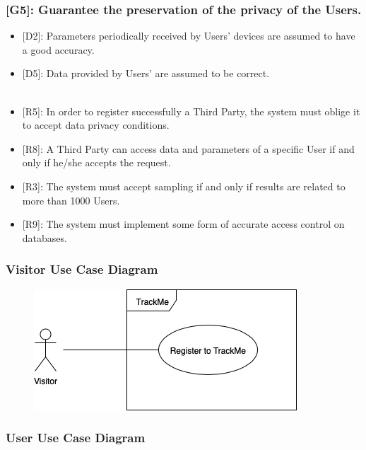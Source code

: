 \documentclass[12pt,a4paper]{article}
\begin{document}
		\subsubsection*{{[}{G5}{]}: Guarantee the preservation of the privacy of the Users.}
			\begin{itemize}
				\begin{itemize}
					\item {[D2]}: Parameters periodically received by Users' devices are assumed to have a good accuracy. 
					\item {[D5]}: Data provided by Users' are assumed to be correct. 
					\\\\
					\item {[R5]}: In order to register successfully a Third Party, the system must oblige it to accept data privacy conditions.
					\item {[R8]}: A Third Party can access data and parameters of a specific User if and only if he/she accepts the request.
					\item {[R3]}: The system must accept sampling if and only if results are related to more than 1000 Users.
					\item {[R9]}: The system must implement some form of accurate access control on databases.
				\end{itemize}
			\end{itemize}
		
		\newpage
		\subsubsection{Visitor Use Case Diagram}
			\begin{figure}[h]
				\centering
				\includegraphics[width=0.7\linewidth]{Images/use_case_visitor}
				\label{fig:use_case_visitor}
			\end{figure}
		
		\subsubsection{User Use Case Diagram}
			\begin{figure}[h]
				\centering
				\label{fig:use_case_user}
			\end{figure}
		
\end{document}
